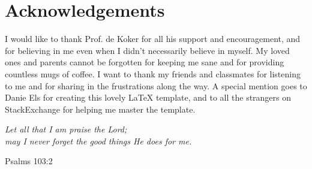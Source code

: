 \chapter{Acknowledgements}
 
I would like to thank Prof. de Koker for all his support and encouragement, and for believing in me even when I didn't necessarily believe in myself.
My loved ones and parents cannot be forgotten for keeping me sane and for providing countless mugs of coffee.
I want to thank my friends and classmates for listening to me and for sharing in the frustrations along the way.
A special mention goes to Danie Els for creating this lovely LaTeX template, and to all the strangers on StackExchange for helping me master the template.
\vfill
\begin{center}

\textit{Let all that I am praise the Lord; \\
may I never forget the good things He does for me.}

Psalms 103:2
\end{center}